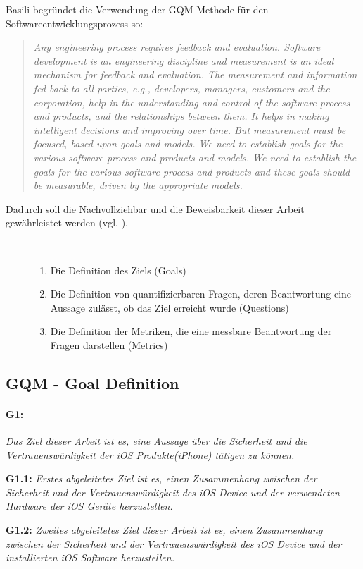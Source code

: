 Basili begründet die Verwendung der GQM Methode für den Softwareentwicklungsprozess so: 
\begin{quote}
    \textit{\glqq Any engineering process requires feedback and evaluation. Software development is an engineering discipline and measurement is an ideal mechanism for feedback and evaluation. The measurement and information fed back to all parties, e.g., developers, managers, customers and the corporation, help in the understanding and control of the software process and products, and the relationships between them. It helps in making intelligent decisions and improving over time. But measurement must be focused, based upon goals and models. We need to establish goals for the various software process and products and models. We need to establish the goals for the various software process and products and these goals should be measurable, driven by the appropriate models.\grqq{}} \cite{GQM[4]} 
\end{quote}
 
Dadurch soll die Nachvollziehbar und die Beweisbarkeit dieser Arbeit gewährleistet werden (vgl. \cite{GQM[3], GQM[4]}).
\begin{description}
    \item[\parbox{\textwidth} {Die GQM-Methode ist in drei Schritte unterteilt und dient zur Bewertung der erhobenen Daten}]~\par
    \begin{enumerate}
        \item Die Definition des Ziels (Goals)
        \item Die Definition von quantifizierbaren Fragen, deren Beantwortung eine Aussage zulässt, ob das Ziel erreicht wurde (Questions)
        \item Die Definition der Metriken, die eine messbare Beantwortung der Fragen darstellen (Metrics)
    \end{enumerate}
\end{description} 

\subsection{GQM - Goal Definition}
\label{sec:GQMGoal}

\paragraph{G1:} \textit{\glqq Das Ziel dieser Arbeit ist es, eine Aussage über die Sicherheit und die Vertrauenswürdigkeit der iOS Produkte(iPhone) tätigen zu können.\grqq{}} \par 
\textbf{G1.1:} \textit{\glqq Erstes abgeleitetes Ziel ist es, einen Zusammenhang zwischen der Sicherheit und der Vertrauenswürdigkeit des iOS Device und der verwendeten Hardware der iOS Geräte herzustellen.\grqq{}} \par 
\textbf{G1.2:} \textit{\glqq Zweites abgeleitetes Ziel dieser Arbeit ist es, einen Zusammenhang zwischen der Sicherheit und der Vertrauenswürdigkeit des iOS Device und der installierten iOS Software herzustellen.\grqq{}}

